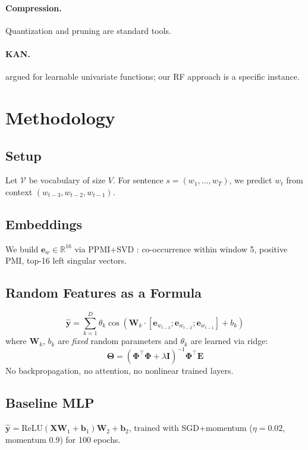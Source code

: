 \documentclass[11pt,a4paper]{article}
\begin{document}
\paragraph{Compression.} Quantization \citep{jacob2018quantization,frantar2023gptq} and pruning \citep{han2015deep,frankle2019lottery} are standard tools.
\paragraph{KAN.} \citet{liu2024kan} argued for learnable univariate functions; our RF approach is a specific instance.

\section{Methodology}
\subsection{Setup}
Let $\mathcal{V}$ be vocabulary of size $V$. For sentence $s=(w_1,\ldots,w_T)$, we predict $w_t$ from context $(w_{t-3}, w_{t-2}, w_{t-1})$.

\subsection{Embeddings}
We build $\mathbf{e}_w \in \mathbb{R}^{16}$ via PPMI+SVD \citep{levy2015improving}: co-occurrence within window 5, positive PMI, top-16 left singular vectors.

\subsection{Random Features as a Formula}
\begin{equation}
\hat{\mathbf{y}} = \sum_{k=1}^{D} \theta_k \cos\left(\mathbf{W}_k \cdot [\mathbf{e}_{w_{t-3}}; \mathbf{e}_{w_{t-2}}; \mathbf{e}_{w_{t-1}}] + b_k\right)
\end{equation}
where $\mathbf{W}_k$, $b_k$ are \emph{fixed} random parameters and $\theta_k$ are learned via ridge:
\begin{equation}
\boldsymbol{\Theta} = (\mathbf{\Phi}^\top \mathbf{\Phi} + \lambda \mathbf{I})^{-1} \mathbf{\Phi}^\top \mathbf{E}
\end{equation}
No backpropagation, no attention, no nonlinear trained layers.

\subsection{Baseline MLP}
$\hat{\mathbf{y}} = \mathrm{ReLU}(\mathbf{X}\mathbf{W}_1+\mathbf{b}_1)\mathbf{W}_2+\mathbf{b}_2$, trained with SGD+momentum ($\eta=0.02$, momentum 0.9) for 100 epochs.
\end{document}
